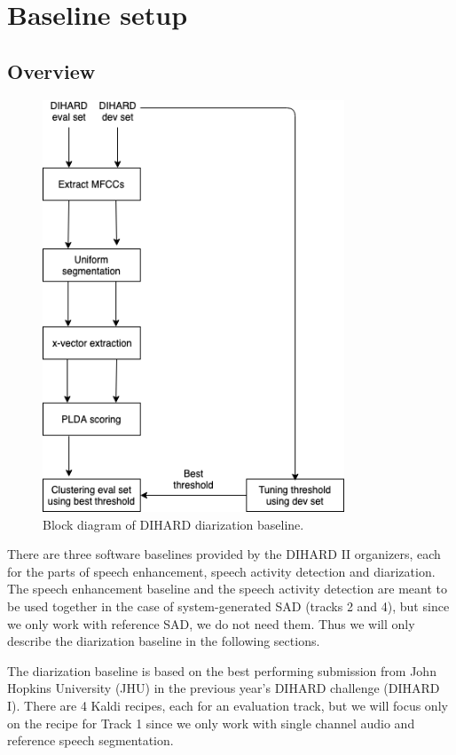 \chapter{Baseline setup}

\section{Overview}

\begin{figure}[h]
	\includegraphics[width=9cm]{figures/baseline.png}
	\centering
	\caption{Block diagram of DIHARD diarization baseline.}
	\label{fig:fig-baseline}
\end{figure}

There are three software baselines provided by the DIHARD II organizers, each for the parts of speech enhancement, speech activity detection and diarization. The speech enhancement baseline and the speech activity detection are meant to be used together in the case of system-generated SAD (tracks 2 and 4), but since we only work with reference SAD, we do not need them. Thus we will only describe the diarization baseline in the following sections.

The diarization baseline is based on the best performing submission \cite{sell2018diarization} from John Hopkins University (JHU) in the previous year's DIHARD challenge (DIHARD I). There are 4 Kaldi recipes, each for an evaluation track, but we will focus only on the recipe for Track 1 since we only work with single channel audio and reference speech segmentation.


